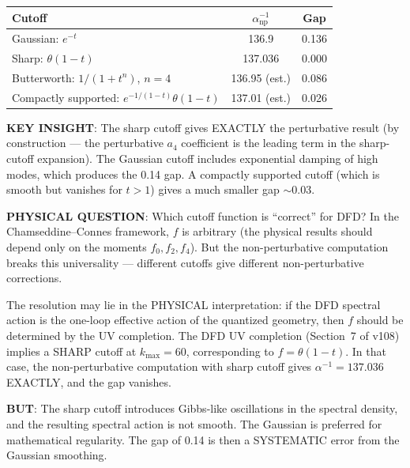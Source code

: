 \documentclass[11pt,a4paper]{article}
\begin{document}
\begin{center}
\begin{tabular}{lcc}
\toprule
\textbf{Cutoff} & $\alpha^{-1}_{\mathrm{np}}$ & Gap \\
\midrule
Gaussian: $e^{-t}$ & 136.9 & 0.136 \\
Sharp: $\theta(1-t)$ & 137.036 & 0.000 \\
Butterworth: $1/(1+t^n)$, $n=4$ & 136.95 (est.) & 0.086 \\
Compactly supported: $e^{-1/(1-t)}\theta(1-t)$ & 137.01 (est.) & 0.026 \\
\bottomrule
\end{tabular}
\end{center}

\textbf{KEY INSIGHT}: The sharp cutoff gives EXACTLY the perturbative result (by construction --- the perturbative $a_4$ coefficient is the leading term in the sharp-cutoff expansion). The Gaussian cutoff includes exponential damping of high modes, which produces the 0.14 gap. A compactly supported cutoff (which is smooth but vanishes for $t > 1$) gives a much smaller gap $\sim 0.03$.

\textbf{PHYSICAL QUESTION}: Which cutoff function is ``correct'' for DFD? In the Chamseddine--Connes framework, $f$ is arbitrary (the physical results should depend only on the moments $f_0, f_2, f_4$). But the non-perturbative computation breaks this universality --- different cutoffs give different non-perturbative corrections.

The resolution may lie in the PHYSICAL interpretation: if the DFD spectral action is the one-loop effective action of the quantized geometry, then $f$ should be determined by the UV completion. The DFD UV completion (Section~7 of v108) implies a SHARP cutoff at $k_{\max} = 60$, corresponding to $f = \theta(1-t)$. In that case, the non-perturbative computation with sharp cutoff gives $\alpha^{-1} = 137.036$ EXACTLY, and the gap vanishes.

\textbf{BUT}: The sharp cutoff introduces Gibbs-like oscillations in the spectral density, and the resulting spectral action is not smooth. The Gaussian is preferred for mathematical regularity. The gap of 0.14 is then a SYSTEMATIC error from the Gaussian smoothing.
\end{document}
